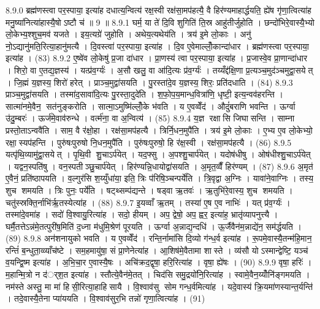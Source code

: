 8.9.0
ब्रह्म॑णस्त्वा पर॒स्पाया॒ इत्या॑ह दधात्य॒न्वित्य॑ रक्ष॒स्वी रक्ष॑सा॒मप॑हत्यै॒ वै हिर॑ण्यमाहार्द्धयति॒ ह्ये॑ष गृ॑णा॒त्वित्या॑ह मनु॒ष्या॑नित्या॑हास्यै॒षोऽष्टौ च॑ ॥ 9 ॥
8.9.1
घर्म॒ या ते॑ दि॒वि शुगिति॑ ति॒स्र आहु॑तीर्जुहोति । छन्दो॑भिरे॒वास्यै॒भ्यो लो॒केभ्य॒श्शुच॒मव॑ यजते । इय॒त्यग्रे॑ जुहोति । अथेय॒त्यथेय॑ति । त्रय॑ इ॒मे लो॒काः । अनु॑ नो॒ऽद्यानु॑मति॒रित्या॒हानु॑मत्यै । दि॒वस्त्वा॑ पर॒स्पाया॒ इत्या॑ह । दि॒व ए॒वेमाल्लोँ॒कान्दा॑धार । ब्रह्म॑णस्त्वा पर॒स्पाया॒ इत्या॑ह । (83)
8.9.2
ए॒ष्वे॑व लो॒केषु॑ प्र॒जा दा॑धार । प्रा॒णस्य॑ त्वा पर॒स्पाया॒ इत्या॑ह । प्र॒जास्वे॒व प्रा॒णान्दा॑धार । शिरो॒ वा ए॒तद्य॒ज्ञस्य॑ । यत्प्र॑व॒र्ग्यः॑ । अ॒सौ खलु॒ वा आ॑दि॒त्यः प्र॑व॒र्ग्यः॑ । तय्यँद्द॑क्षि॒णा प्र॒त्यञ्च॒मुद॑ञ्चमुद्वा॒सयेत् । जि॒ह्मं य॒ज्ञस्य॒ शिरो॑ हरेत् । प्राञ्च॒मुद्वा॑सयति । पु॒रस्ता॑दे॒व य॒ज्ञस्य॒ शिरः॒ प्रति॑दधाति । (84)
8.9.3
प्राञ्च॒मुद्वा॑सयति । तस्मा॑द॒सावा॑दि॒त्यः पु॒रस्ता॒दुदे॑ति । श॒फो॒प॒य॒मान्ध॒वित्रा॑णि॒ धृष्टी॒ इत्य॒न्वव॑हरन्ति । सात्मा॑नमे॒वैन॒ सत॑नुङ्करोति । सात्मा॒ऽमुष्मि॑ल्लोँ॒के भ॑वति । य ए॒वव्वेँद॑ । औदुं॑बराणि भवन्ति । ऊर्ग्वा उ॑दु॒म्बरः॑ । ऊर्ज॑मे॒वाव॑रुन्धे । वर्त्म॑ना॒ वा अ॒न्वित्य॑ । (85)
8.9.4
य॒ज्ञ रक्षासि जिघासन्ति । साम्ना प्रस्तो॒ताऽन्ववै॑ति । साम॒ वै र॑क्षो॒हा । रक्ष॑सा॒मप॑हत्यै । त्रिर्नि॒धन॒मुपै॑ति । त्रय॑ इ॒मे लो॒काः । ए॒भ्य ए॒व लो॒केभ्यो॒ रक्षा॒स्यप॑हन्ति । पुरु॑षःपुरुषो नि॒धन॒मुपै॑ति । पुरु॑षःपुरुषो॒ हि र॑क्ष॒स्वी । रक्ष॑सा॒मप॑हत्यै । (86)
8.9.5
यत्पृ॑थि॒व्यामु॑द्वा॒सयेत् । पृ॒थि॒वी शु॒चाऽर्प॑येत् । यद॒फ्सु । अ॒पश्शु॒चार्प॑येत् । यदोष॑धीषु । ओष॑धीश्शु॒चाऽर्प॑येत् । यद्वन॒स्पति॑षु । वन॒स्पतीञ्छु॒चार्प॑येत् । हिर॑ण्यन्नि॒धायोद्वा॑सयति । अ॒मृत॒व्वैँ हिर॑ण्यम् । (87)
8.9.6
अ॒मृत॑ ए॒वैनं॒ प्रति॑ष्ठापयति । व॒ल्गुर॑सि श॒य्युँधा॑या॒ इति॒ त्रिः प॑रिषि॒ञ्चन्पर्ये॑ति । त्रि॒वृद्वा अ॒ग्निः । यावा॑ने॒वाग्निः । तस्य॒ शुच शमयति । त्रिः पुनः॒ पर्ये॑ति । षट्थ्सम्प॑द्यन्ते । षड्वा ऋ॒तवः॑ । ऋ॒तुभि॑रे॒वास्य॒ शुच शमयति । चतु॑स्स्रक्ति॒र्नाभि॑र्\mbox{}ऋ॒तस्येत्या॑ह । (88)
8.9.7
इ॒यव्वाँ ऋ॒तम् । तस्या॑ ए॒ष ए॒व नाभिः॑ । यत् प्र॑व॒र्ग्यः॑ । तस्मा॑दे॒वमा॑ह । सदो॑ वि॒श्वायु॒रित्या॑ह । सदो॒ हीयम् । अप॒ द्वेषो॒ अप॒ ह्वर॒ इत्या॑ह॒ भ्रातृ॑व्यापनुत्त्यै । घर्मै॒तत्तेऽन्न॑मे॒तत्पुरी॑ष॒मिति॑ द॒ध्ना म॑धुमि॒श्रेण॑ पूरयति । ऊर्ग्वा अ॒न्नाद्य॒न्दधि॑ । ऊ॒र्जैवैन॑म॒न्नाद्ये॑न॒ सम॑र्द्धयति । (89)
8.9.8
अन॑शनायुको भवति । य ए॒वव्वेँद॑ । रन्ति॒र्नामा॑सि दि॒व्यो ग॑न्ध॒र्व इत्या॑ह । रू॒पमे॒वास्यै॒तन्म॑हि॒मान॒ रन्तिं॑ ब॒न्धुता॒व्व्याँच॑ष्टे । सम॒हमायु॑षा॒ सं प्रा॒णेनेत्या॑ह । आ॒शिष॑मे॒वैतामा शास्ते । व्य॑सौ योऽस्मान्द्वेष्टि॒ यञ्च॑ व॒यन्द्वि॒ष्म इत्या॑ह । अ॒भि॒चा॒र ए॒वास्यै॒षः । अचि॑क्रद॒द्वृषा॒ हरि॒रित्या॑ह । वृषा॒ ह्ये॑षः । (90)
8.9.9
वृषा॒ हरिः॑ । म॒हान्मि॒त्रो न द॑र््श॒त इत्या॑ह । स्तौत्ये॒वैन॑मे॒तत् । चिद॑सि समु॒द्रयो॑नि॒रित्या॑ह । स्वामे॒वैन॒य्योँनि॑ङ्गमयति । नम॑स्ते अस्तु॒ मा मा॑ हिसी॒रित्या॒हाहिसायै । वि॒श्वाव॑सु सोम गन्ध॒र्वमित्या॑ह । यदे॒वास्य॑ क्रि॒यमा॑णस्यान्त॒र्यन्ति॑ । तदे॒वास्यै॒तेना प्या॑ययति । वि॒श्वाव॑सुर॒भि तन्नो॑ गृणा॒त्वित्या॑ह । (91)
